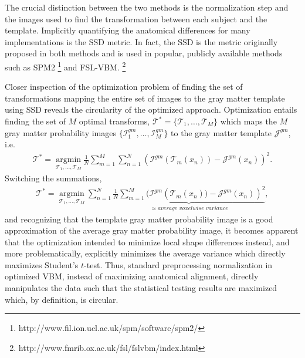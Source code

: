 \documentclass[]{spie}  %
\begin{document}
The crucial distinction between the two methods is the normalization step and the images
used to find the transformation between each subject and the template. 
Implicitly quantifying the anatomical differences for many implementations
is the SSD metric.
In fact, the SSD is the metric originally proposed in both methods
and is used in popular, publicly available methods such as SPM2%
\footnote{
http://www.fil.ion.ucl.ac.uk/spm/software/spm2/
}
and FSL-VBM.%
\footnote{
http://www.fmrib.ox.ac.uk/fsl/fslvbm/index.html
}

Closer inspection of the optimization problem of finding the 
set of transformations mapping the entire set of images to the gray
matter template using SSD reveals the circularity of the optimized approach.  
Optimization entails finding the set of $M$ optimal transforms, $\mathcal{T}^*
=\{\mathcal{T}_1, \ldots, \mathcal{T}_M\}$ which maps the $M$ gray 
matter probability images  $\{\mathcal{I}^{gm}_1, \ldots, \mathcal{I}^{gm}_M\}$
to the gray matter template $\mathcal{J}^{gm}$, i.e. 
\begin{align}
  \mathcal{T}^* = \underset{\mathcal{T}_1, \ldots, \mathcal{T}_M}{\operatorname{argmin}}\frac{1}{N}\sum_{m=1}^{M}\sum_{n=1}^N \left(\mathcal{I}^{gm}(\mathcal{T}_m(x_n))-\mathcal{J}^{gm}(x_n)\right)^2.
\end{align}
Switching the summations, 
\begin{align}
  \label{eq:circularity}
  \mathcal{T}^* = \underset{\mathcal{T}_1, \ldots, \mathcal{T}_M}{\operatorname{argmin}}\sum_{n=1}^N 
  \underbrace{\frac{1}{N}\sum_{m=1}^{M}(\mathcal{I}^{gm}\left(\mathcal{T}_m(x_n))-\mathcal{J}^{gm}(x_n)\right)^2}_{\approx average\,\,voxelwise\,\,variance},
\end{align}
 and recognizing that the template gray matter probability
image is a good approximation of the average gray matter probability image, it becomes
apparent that the optimization intended to minimize local shape differences instead, and
more problematically, explicitly minimizes the average variance which directly 
maximizes Student's $t$-test.  Thus, standard preprocessing normalization 
in optimized VBM, instead of maximizing anatomical alignment,  directly manipulates the 
data such that the statistical testing results are maximized which, by 
definition\cite{kriegeskorte2009}, is circular.
\end{document}
